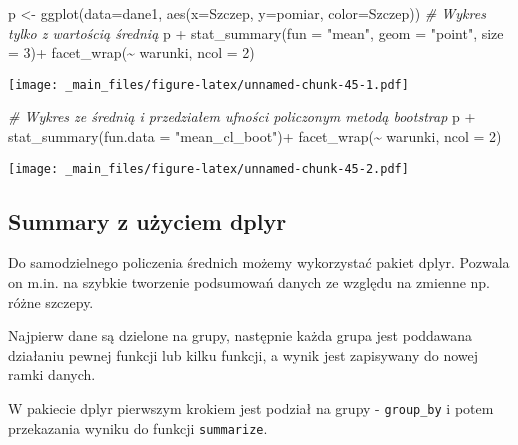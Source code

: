 \documentclass[
]{book}
\newenvironment{Shaded}{\begin{snugshade}}{\end{snugshade}}
\newcommand{\AttributeTok}[1]{\textcolor[rgb]{0.77,0.63,0.00}{#1}}
\newcommand{\CommentTok}[1]{\textcolor[rgb]{0.56,0.35,0.01}{\textit{#1}}}
\newcommand{\DecValTok}[1]{\textcolor[rgb]{0.00,0.00,0.81}{#1}}
\newcommand{\FunctionTok}[1]{\textcolor[rgb]{0.00,0.00,0.00}{#1}}
\newcommand{\NormalTok}[1]{#1}
\newcommand{\OtherTok}[1]{\textcolor[rgb]{0.56,0.35,0.01}{#1}}
\newcommand{\SpecialCharTok}[1]{\textcolor[rgb]{0.00,0.00,0.00}{#1}}
\newcommand{\StringTok}[1]{\textcolor[rgb]{0.31,0.60,0.02}{#1}}
\begin{document}
\begin{Shaded}
\begin{Highlighting}[]
\NormalTok{p }\OtherTok{\textless{}{-}} \FunctionTok{ggplot}\NormalTok{(}\AttributeTok{data=}\NormalTok{dane1, }\FunctionTok{aes}\NormalTok{(}\AttributeTok{x=}\NormalTok{Szczep, }\AttributeTok{y=}\NormalTok{pomiar, }\AttributeTok{color=}\NormalTok{Szczep))}
\CommentTok{\# Wykres tylko z wartością średnią}
\NormalTok{p }\SpecialCharTok{+} \FunctionTok{stat\_summary}\NormalTok{(}\AttributeTok{fun =} \StringTok{"mean"}\NormalTok{, }\AttributeTok{geom =} \StringTok{"point"}\NormalTok{, }\AttributeTok{size =} \DecValTok{3}\NormalTok{)}\SpecialCharTok{+}
  \FunctionTok{facet\_wrap}\NormalTok{(}\SpecialCharTok{\textasciitilde{}}\NormalTok{ warunki, }\AttributeTok{ncol =} \DecValTok{2}\NormalTok{)}
\end{Highlighting}
\end{Shaded}

\texttt{[image: \_main\_files/figure-latex/unnamed-chunk-45-1.pdf]}

\begin{Shaded}
\begin{Highlighting}[]
\CommentTok{\# Wykres ze średnią i przedziałem ufności policzonym metodą bootstrap}
\NormalTok{p }\SpecialCharTok{+} \FunctionTok{stat\_summary}\NormalTok{(}\AttributeTok{fun.data =} \StringTok{"mean\_cl\_boot"}\NormalTok{)}\SpecialCharTok{+}
  \FunctionTok{facet\_wrap}\NormalTok{(}\SpecialCharTok{\textasciitilde{}}\NormalTok{ warunki, }\AttributeTok{ncol =} \DecValTok{2}\NormalTok{)}
\end{Highlighting}
\end{Shaded}

\texttt{[image: \_main\_files/figure-latex/unnamed-chunk-45-2.pdf]}

\hypertarget{summary-z-uux17cyciem-dplyr}{%
\subsection{Summary z użyciem dplyr}\label{summary-z-uux17cyciem-dplyr}}

Do samodzielnego policzenia średnich możemy wykorzystać pakiet dplyr. Pozwala on m.in. na szybkie tworzenie podsumowań danych ze względu na zmienne np. różne szczepy.

Najpierw dane są dzielone na grupy, następnie każda grupa jest poddawana działaniu pewnej funkcji lub kilku funkcji, a wynik jest zapisywany do nowej ramki danych.

W pakiecie dplyr pierwszym krokiem jest podział na grupy - \texttt{group\_by} i potem przekazania wyniku do funkcji \texttt{summarize}.
\end{document}
